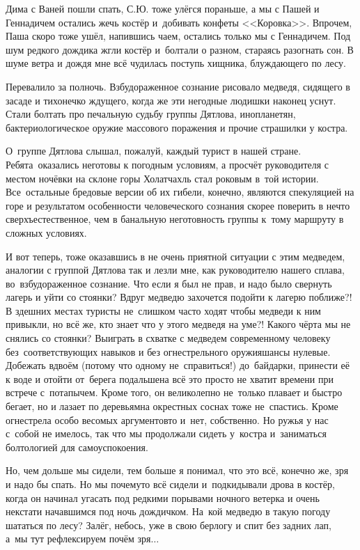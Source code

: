Дима с Ваней пошли спать, С.Ю. тоже улёгся пораньше, а мы с Пашей и Геннадичем остались жечь костёр и~добивать конфеты <<Коровка>>. Впрочем, Паша скоро тоже ушёл, напившись чаем, остались только мы с Геннадичем. Под шум редкого дождика жгли костёр и~болтали о разном, стараясь разогнать сон. В шуме ветра и дождя мне всё чудилась поступь хищника, блуждающего по лесу. 

Перевалило за полночь. Взбудораженное сознание рисовало медведя, сидящего в засаде и тихонечко ждущего, когда же эти негодные людишки наконец уснут. Стали болтать про печальную судьбу группы Дятлова, инопланетян, бактериологическое оружие массового поражения и прочие страшилки у костра. 

О~группе Дятлова слышал, пожалуй, каждый турист в нашей стране. Ребята~оказались неготовы к погодным условиям, а просчёт руководителя с местом ночёвки на склоне горы Холатчахль стал роковым в~той истории. Все~остальные бредовые версии об их гибели, конечно, являются спекуляцией на горе и результатом особенности человеческого сознания скорее поверить в нечто сверхъестественное, чем в банальную неготовность группы к~тому маршруту в сложных условиях. 

И вот теперь, тоже оказавшись в не очень приятной ситуации с этим медведем, аналогии с группой Дятлова так и лезли мне, как руководителю нашего сплава, во~взбудораженное сознание. Что если я был не прав, и надо было свернуть лагерь и уйти со стоянки? Вдруг медведю захочется подойти к лагерю поближе?! В здешних местах туристы не~слишком часто ходят чтобы медведи к ним привыкли, но всё же, кто знает что у этого медведя на уме?! Какого чёрта мы не снялись со стоянки? Выиграть в схватке с медведем современному человеку без~соответствующих навыков и без огнестрельного оружия\mdash шансы нулевые. Добежать вдвоём (потому что одному не~справиться!) до~байдарки, принести её к воде и отойти от~берега подальше\mdash на всё это просто не хватит времени при встрече с~потапычем. Кроме того, он великолепно не~только плавает и быстро бегает, но и лазает по деревьям\mdash на окрестных соснах тоже не~спастись. Кроме огнестрела особо весомых аргументов\sdash то и~нет, собственно. Но ружья у нас с~собой не имелось, так что мы продолжали сидеть у~костра и~заниматься болтологией для самоуспокоения.

Но, чем дольше мы сидели, тем больше я понимал, что это всё, конечно же, зря и надо бы спать. Но мы почему\sdash то всё сидели и~подкидывали дрова в костёр, когда он начинал угасать под редкими порывами ночного ветерка и очень некстати начавшимся под ночь дождичком. На~кой медведю в такую погоду шататься по лесу? Залёг, небось, уже в свою берлогу и спит без задних лап, а~мы тут рефлексируем почём зря$\ldots$ 


